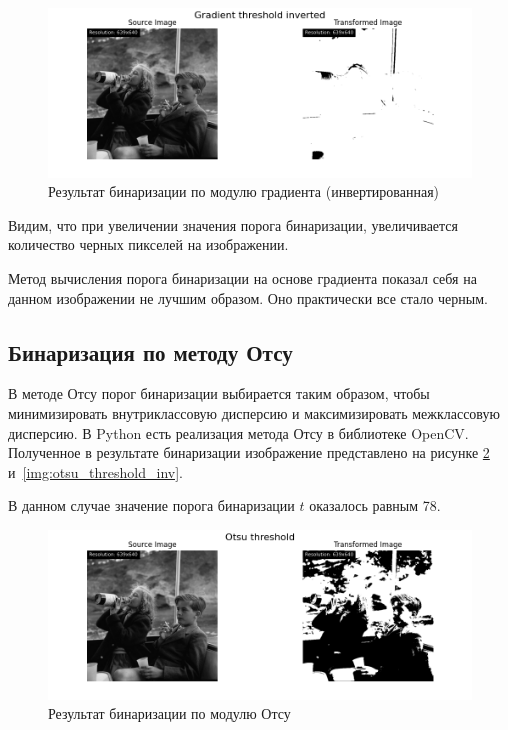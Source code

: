\begin{figure}[ht!]
    \centering
    \includegraphics[width=\textwidth]{../results/Gradient threshold inverted.png}
    \caption{Результат бинаризации по модулю градиента (инвертированная)}
    \label{img:binarization_gradient_inv}
\end{figure}

Видим, что при увеличении значения порога бинаризации, увеличивается количество черных пикселей на изображении.

Метод вычисления порога бинаризации на основе градиента показал себя на данном изображении не лучшим образом. Оно практически все стало черным. 

\FloatBarrier
\subsection{Бинаризация по методу Отсу}

В методе Отсу порог бинаризации выбирается таким образом, чтобы минимизировать внутриклассовую дисперсию и максимизировать межклассовую дисперсию.
В Python есть реализация метода Отсу в библиотеке OpenCV. Полученное в результате бинаризации изображение представлено на рисунке \ref{img:otsu_threshold} и~\ref{img:otsu_threshold_inv}.

В данном случае значение порога бинаризации $t$ оказалось равным 78.
\begin{figure}[ht!]
    \centering
    \includegraphics[width=\textwidth]{../results/Otsu threshold.png}
    \caption{Результат бинаризации по модулю Отсу}
    \label{img:otsu_threshold}
\end{figure}

